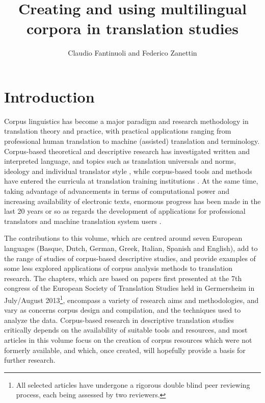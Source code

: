 \documentclass[output=paper]{LSP/langsci}
\author{Claudio Fantinuoli and Federico Zanettin}
\title{Creating and using multilingual corpora in translation studies}
\begin{document}
\section{Introduction}
Corpus linguistics has become a major paradigm and research methodology in translation theory and practice, with practical applications ranging from professional human translation to machine (assisted) translation and terminology. Corpus-based theoretical and descriptive research has investigated written and interpreted language, and topics such as translation universals and norms, ideology and individual translator style \citep{Laviosa2002, Olohan2004, Zanettin2012}, while corpus-based tools and methods have entered the curricula at translation training institutions \citep{Zanettin2003, Beeby2009}. At the same time, taking advantage of advancements in terms of computational power and increasing availability of electronic texts, enormous progress has been made in the last 20 years or so as regards the development of applications for professional translators and machine translation system users \citep{Coehn2009, Brunette2013}.

The contributions to this volume, which are centred around seven European languages (Basque, Dutch, German, Greek, Italian, Spanish and English), add to the range of studies of corpus-based descriptive studies, and provide examples of some less explored applications of corpus analysis methods to translation research. The chapters, which are based on papers first presented at the 7th congress of the European Society of Translation Studies held in Germersheim in July/August 2013\footnote{All selected articles have undergone a rigorous double blind peer reviewing process, each being assessed by two reviewers.}, encompass a variety of research aims and methodologies, and vary as concerns corpus design and compilation, and the techniques used to analyze the data. Corpus-based research in descriptive translation studies critically depends on the availability of suitable tools and resources, and most articles in this volume focus on the creation of corpus resources which were not formerly available, and which, once created, will hopefully provide a basis for further research. 
\end{document}
